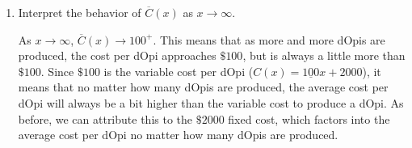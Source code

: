 \documentclass{ximera}
\begin{document}
\begin{problem}
\begin{enumerate}
\begin{solution}
    We find $\ds{\lim_{x \rightarrow 0^{+}} \overline{C}(x) = \infty}$.  This means that as fewer and fewer dOpis are produced, the cost per dOpi becomes unbounded.  In this situation, there is a fixed cost of $\$2000$ ($C(0) = 2000$), we are trying to spread that $\$2000$ over fewer and fewer dOpis.
\end{solution}

\item  Interpret the behavior of $\overline{C}(x)$ as $x \rightarrow \infty$.

\begin{solution}
    As $x \rightarrow \infty$,  $\overline{C}(x) \rightarrow 100^{+}$.  This means that as more and more dOpis are produced, the cost per dOpi approaches $\$100$, but is always a little more than $\$100$.  Since $\$100$ is the variable cost per dOpi ($C(x) = \underline{100}x+2000$), it means that no matter how many dOpis are produced, the average cost per dOpi will always be a bit higher than the variable cost to produce a dOpi.  As before, we can attribute this to the $\$2000$ fixed cost, which factors into the average cost per dOpi no matter how many dOpis are produced.
\end{solution}

\end{enumerate}
\end{problem}
\end{document}
